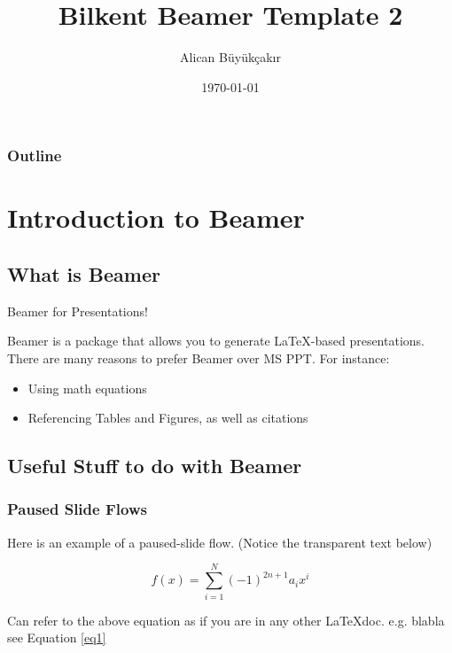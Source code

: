 \documentclass{beamer}
\title{Bilkent Beamer Template 2}
\author{Alican Büyükçakır}
\institute{Computer Engineering Department, Bilkent University}
\date{\today}
\begin{document}
\begin{frame}
  \titlepage
\end{frame}

\begin{frame}
  \frametitle{Outline}

  \tableofcontents
\end{frame}


\section{Introduction to Beamer}

\subsection{What is Beamer}

\begin{frame}{Beamer for Presentations!}

  Beamer is a package that allows you to generate \LaTeX-based presentations. There are many reasons to prefer Beamer over MS PPT. For instance:
  
  \begin{itemize}
      \item Using math equations
      \item Referencing Tables and Figures, as well as citations \cite{buyukccakir2018novel}
  \end{itemize}
  
\end{frame}

\subsection{Useful Stuff to do with Beamer}

\begin{frame}
\frametitle{Paused Slide Flows}
    
    Here is an example of a paused-slide flow. (Notice the transparent text below)
    
    \pause
    \begin{equation}
    \label{eq1}
    f(x) = \sum_{i=1}^N (-1)^{2n+1} a_i x^i
    \end{equation}

    \pause 
    
    Can refer to the above equation as if you are in any other \LaTeX doc. e.g. blabla see Equation \ref{eq1}
\end{frame}
\end{document}
